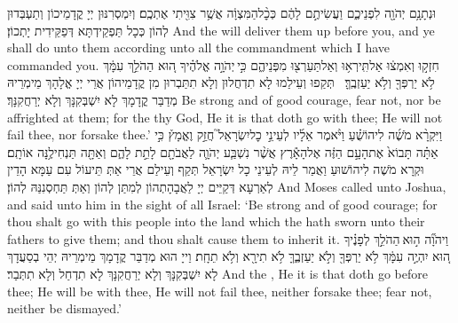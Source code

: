{וּנְתָנָ֥ם יְהֹוָ֖ה לִפְנֵיכֶ֑ם וַעֲשִׂיתֶ֣ם לָהֶ֔ם כְּכׇ֨ל\maqqaf הַמִּצְוָ֔ה אֲשֶׁ֥ר צִוִּ֖יתִי אֶתְכֶֽם׃}
{וְיִמְסְרִנּוּן יְיָ קֳדָמֵיכוֹן וְתַעְבְּדוּן לְהוֹן כְּכָל תַּפְקֵידְתָּא דְּפַקֵּידִית יָתְכוֹן׃}
{And the \lord\space will deliver them up before you, and ye shall do unto them according unto all the commandment which I have commanded you.}{}
{חִזְק֣וּ וְאִמְצ֔וּ אַל\maqqaf תִּֽירְא֥וּ וְאַל\maqqaf תַּעַרְצ֖וּ מִפְּנֵיהֶ֑ם כִּ֣י \legarmeh  יְהֹוָ֣ה אֱלֹהֶ֗יךָ ה֚וּא הַהֹלֵ֣ךְ עִמָּ֔ךְ לֹ֥א יַרְפְּךָ֖ וְלֹ֥א יַעַזְבֶֽךָּ׃ \setuma }
{תְּקַפוּ וְעֵילַמוּ לָא תִדְחֲלוּן וְלָא תִתַּבְרוּן מִן קֳדָמֵיהוֹן אֲרֵי יְיָ אֱלָהָךְ מֵימְרֵיהּ מְדַבַּר קֳדָמָךְ לָא יִשְׁבְּקִנָּךְ וְלָא יְרַחֲקִנָּךְ׃}
{Be strong and of good courage, fear not, nor be affrighted at them; for the \lord\space thy God, He it is that doth go with thee; He will not fail thee, nor forsake thee.’}{}
{וַיִּקְרָ֨א מֹשֶׁ֜ה לִיהוֹשֻׁ֗עַ וַיֹּ֨אמֶר אֵלָ֜יו לְעֵינֵ֣י כׇל\maqqaf יִשְׂרָאֵל֮ חֲזַ֣ק וֶאֱמָץ֒ כִּ֣י אַתָּ֗ה תָּבוֹא֙ אֶת\maqqaf הָעָ֣ם הַזֶּ֔ה אֶל\maqqaf הָאָ֕רֶץ אֲשֶׁ֨ר נִשְׁבַּ֧ע יְהֹוָ֛ה לַאֲבֹתָ֖ם לָתֵ֣ת לָהֶ֑ם וְאַתָּ֖ה תַּנְחִילֶ֥נָּה אוֹתָֽם׃}
{וּקְרָא מֹשֶׁה לִיהוֹשׁוּעַ וַאֲמַר לֵיהּ לְעֵינֵי כָל יִשְׂרָאֵל תְּקַף וְעֵילַם אֲרֵי אַתְּ תֵּיעוֹל עִם עַמָּא הָדֵין לְאַרְעָא דְּקַיֵּים יְיָ לַאֲבָהָתְהוֹן לְמִתַּן לְהוֹן וְאַתְּ תַּחְסְנִנַּהּ לְהוֹן׃}
{And Moses called unto Joshua, and said unto him in the sight of all Israel: ‘Be strong and of good courage; for thou shalt go with this people into the land which the \lord\space hath sworn unto their fathers to give them; and thou shalt cause them to inherit it.}{}
{וַיהֹוָ֞ה ה֣וּא \legarmeh  הַהֹלֵ֣ךְ לְפָנֶ֗יךָ ה֚וּא יִהְיֶ֣ה עִמָּ֔ךְ לֹ֥א יַרְפְּךָ֖ וְלֹ֣א יַעַזְבֶ֑ךָּ לֹ֥א תִירָ֖א וְלֹ֥א תֵחָֽת׃}
{וַייָ הוּא מְדַבַּר קֳדָמָךְ מֵימְרֵיהּ יְהֵי בְסַעֲדָךְ לָא יִשְׁבְּקִנָּךְ וְלָא יְרַחֲקִנָּךְ לָא תִדְחַל וְלָא תִתְּבַר׃}
{And the \lord, He it is that doth go before thee; He will be with thee, He will not fail thee, neither forsake thee; fear not, neither be dismayed.’}{}
